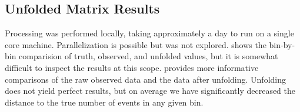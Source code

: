     \subsection{Unfolded Matrix Results}
       

    Processing was performed locally, taking approximately a day to run on a single core machine. Parallelization is possible but was not explored.  shows the bin-by-bin comparision of truth, observed, and unfolded values, but it is somewhat difficult to inspect the results at this scope.  provides more informative comparisons of the raw observed data and the data after unfolding.  Unfolding does not yield perfect results, but on average we have significantly decreased the distance to the true number of events in any given bin.

